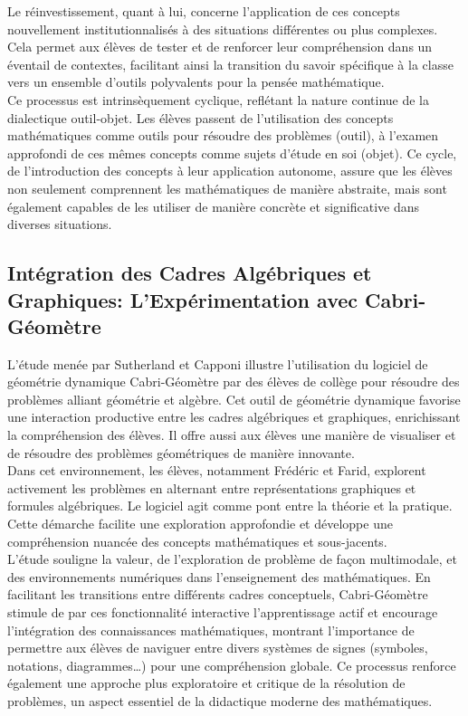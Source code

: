 Le réinvestissement,
quant à lui,
concerne l'application de ces concepts nouvellement institutionnalisés à des situations différentes ou plus complexes.
Cela permet aux élèves de tester et de renforcer leur compréhension dans un éventail de contextes,
facilitant ainsi la transition du savoir spécifique à la classe vers un ensemble d'outils polyvalents pour la pensée mathématique.\\

Ce processus est intrinsèquement cyclique,
reflétant la nature continue de la dialectique outil-objet.
Les élèves passent de l'utilisation des concepts mathématiques comme outils pour résoudre des problèmes (outil),
à l'examen approfondi de ces mêmes concepts comme sujets d'étude en soi (objet).
Ce cycle,
de l'introduction des concepts à leur application autonome,
assure que les élèves non seulement comprennent les mathématiques de manière abstraite,
mais sont également capables de les utiliser de manière concrète et significative dans diverses situations.

\subsection{Intégration des Cadres Algébriques et Graphiques: L'Expérimentation avec Cabri-Géomètre}

L'étude menée par Sutherland et Capponi illustre l'utilisation du logiciel de géométrie dynamique Cabri-Géomètre par des élèves de collège pour résoudre des problèmes alliant géométrie et algèbre.
Cet outil de géométrie dynamique favorise une interaction productive entre les cadres algébriques et graphiques,
enrichissant la compréhension des élèves.
Il offre aussi aux élèves une manière de visualiser et de résoudre des problèmes géométriques de manière innovante.\\

Dans cet environnement,
les élèves,
notamment Frédéric et Farid,
explorent activement les problèmes en alternant entre représentations graphiques et formules algébriques.
Le logiciel agit comme pont entre la théorie et la pratique.
Cette démarche facilite une exploration approfondie et développe une compréhension nuancée des concepts mathématiques et sous-jacents.\\

L'étude souligne la valeur,
de l'exploration de problème de façon multimodale,
et des environnements numériques dans l'enseignement des mathématiques.
En facilitant les transitions entre différents cadres conceptuels,
Cabri-Géomètre stimule de par ces fonctionnalité interactive l'apprentissage actif et encourage l'intégration des connaissances mathématiques,
montrant l'importance de permettre aux élèves de naviguer entre divers systèmes de signes (symboles, notations, diagrammes…) pour une compréhension globale.
Ce processus renforce également une approche plus exploratoire et critique de la résolution de problèmes,
un aspect essentiel de la didactique moderne des mathématiques.